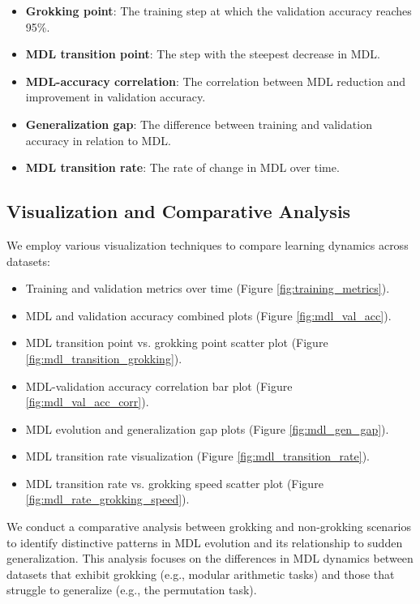 \documentclass{article} %
\begin{document}
\begin{itemize}
    \item \textbf{Grokking point}: The training step at which the validation accuracy reaches 95\%.
    \item \textbf{MDL transition point}: The step with the steepest decrease in MDL.
    \item \textbf{MDL-accuracy correlation}: The correlation between MDL reduction and improvement in validation accuracy.
    \item \textbf{Generalization gap}: The difference between training and validation accuracy in relation to MDL.
    \item \textbf{MDL transition rate}: The rate of change in MDL over time.
\end{itemize}

\subsection{Visualization and Comparative Analysis}
We employ various visualization techniques to compare learning dynamics across datasets:

\begin{itemize}
    \item Training and validation metrics over time (Figure \ref{fig:training_metrics}).
    \item MDL and validation accuracy combined plots (Figure \ref{fig:mdl_val_acc}).
    \item MDL transition point vs. grokking point scatter plot (Figure \ref{fig:mdl_transition_grokking}).
    \item MDL-validation accuracy correlation bar plot (Figure \ref{fig:mdl_val_acc_corr}).
    \item MDL evolution and generalization gap plots (Figure \ref{fig:mdl_gen_gap}).
    \item MDL transition rate visualization (Figure \ref{fig:mdl_transition_rate}).
    \item MDL transition rate vs. grokking speed scatter plot (Figure \ref{fig:mdl_rate_grokking_speed}).
\end{itemize}

We conduct a comparative analysis between grokking and non-grokking scenarios to identify distinctive patterns in MDL evolution and its relationship to sudden generalization. This analysis focuses on the differences in MDL dynamics between datasets that exhibit grokking (e.g., modular arithmetic tasks) and those that struggle to generalize (e.g., the permutation task).
\end{document}
